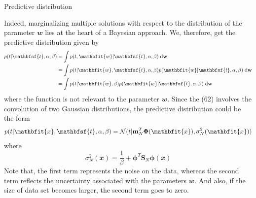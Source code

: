 \documentclass{bredelebeamer}
\begin{document}
\begin{frame}{Predictive distribution}
  \begin{justify}
    Indeed, marginalizing multiple solutions with respect to the distribution of
    the parameter $\mathbfit{w}$ lies at the heart of a Bayesian approach. We,
    therefore, get the predictive distribution given by
    \begin{equation}
      \begin{split}
        p(t | \mathbfsf{t}, \alpha, \beta)
        &= \int p(t, \mathbfit{w} | \mathbfsf{t}, \alpha, \beta)\; \mathrm{d}\mathbf{w}\\
        &= \int p(t | \mathbfit{w}, \mathbfsf{t}, \alpha, \beta) p(\mathbfit{w} | \mathbfsf{t}, \alpha, \beta)\; \mathrm{d}\mathbf{w}\\
        &= \int p(t | \mathbfit{w}, \beta) p(\mathbfit{w} | \mathbfsf{t}, \alpha, \beta)\; \mathrm{d}\mathbf{w}
      \end{split}
    \end{equation}
    where the function is not relevant to the parameter $\mathbfit{w}$.
    Since the (62) involves the convolution of two Gaussian distributions, the
    predictive distribution could be the form
    \begin{equation}
      p(t | \mathbfit{x}, \mathbfsf{t}, \alpha, \beta)
      =\mathcal{N} (t | \mathbf{m}_{N}^{T} \boldsymbol{\Phi}(\mathbfit{x}), \sigma_{N}^{2} (\mathbfit{x}))
    \end{equation}
    where
    \begin{equation}
      \sigma_{N}^{2} (\mathbfit{x}) = \frac{1}{\beta} + \boldsymbol{\phi}^T \mathbf{S}_N \boldsymbol{\phi}(\mathbfit{x})
    \end{equation}
    Note that, the first term represents the noise on the data, whereas the
    second term reflects the uncertainty associated with the parameters $\mathbfit{w}$.
    And also, if the size of data set becomes larger, the second term goes to zero.
  \end{justify}
\end{frame}
\end{document}
